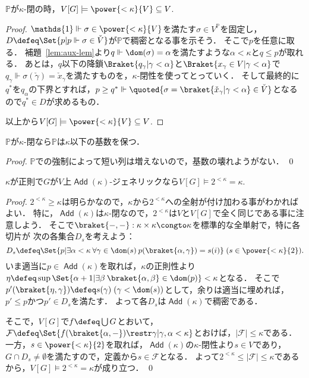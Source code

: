 \documentclass[a4j]{ltjsarticle}
\renewcommand{\Add}{\mathop{\mathsf{Add}}}
\begin{document}
\begin{lemma}
 $\mathbb{P}$が$\kappa$-閉の時，$V[G] \models \power{< \kappa}{V} \subseteq V$.
\end{lemma}
\begin{proof}
 $\mathds{1} \Vdash \sigma \in \power{<\kappa}{V}$を満たす$\sigma \in V^{\mathbb{P}}$を固定し，$D \defeq \Set{p | p \Vdash \sigma \in \check{V}}$が$\mathbb{P}$で稠密となる事を示そう．
 そこで$p$を任意に取る．
 補題~\ref{lem:aux-lem}より$q \Vdash \dom(\sigma) = \alpha$を満たすような$\alpha < \kappa$と$q \leq p$が取れる．
 あとは，$q$以下の降鎖$\Braket{q_\gamma | \gamma < \alpha}$と$\Braket{x_\gamma \in V | \gamma < \alpha}$で$q_\gamma \Vdash \sigma(\check{\gamma}) = \check{x}_\gamma$を満たすものを，$\kappa$-閉性を使ってとっていく．
 そして最終的に$q^*$を$q_\alpha$の下界とすれば，$p \geq q^* \Vdash \quoted{\sigma = \braket{\check{x}_\gamma | \gamma < \alpha} \in \check{V}}$となるので$q^* \in D$が求めるもの．

 以上から$V[G] \models \power{< \kappa}{V} \subseteq V$.
\end{proof}

\begin{corollary}
 $\mathbb{P}$が$\kappa$-閉なら$\mathbb{P}$は$\kappa$以下の基数を保つ．
\end{corollary}
\begin{proof}
 $\mathbb{P}$での強制によって短い列は増えないので，基数の壊れようがない． \qed
\end{proof}

\begin{lemma}
 $\kappa$が正則で$G$が$V$上$\Add(\kappa)$-ジェネリックなら$V[G] \models 2^{< \kappa } = \kappa$.
\end{lemma}
\begin{proof}
 $2^{< \kappa} \geq \kappa$は明らかなので，$\kappa$から$2^{<\kappa}$への全射が付け加わる事がわかればよい．
 特に，$\Add(\kappa)$は$\kappa$-閉なので，$2^{<\kappa}$は$V$と$V[G]$で全く同じである事に注意しよう．
 そこで$\braket{-, -}: \kappa \times \kappa \congto \kappa$を標準的な全単射で，特に各切片が
 次の各集合$D_s$を考えよう：
 \[
  D_s \defeq \Set{p | \exists \alpha < \kappa \: \forall \gamma \in \dom(s) \:p(\braket{\alpha, \gamma}) = s(i)}\;(s \in \power{<\kappa}{2}).
 \]
 いま適当に$p \in \Add(\kappa)$を取れば，$\kappa$の正則性より$\eta \defeq \sup \Set{\alpha+1 | \exists \beta \: \braket{\alpha, \beta} \in \dom(p)} < \kappa$となる．
 そこで$p'(\braket{\eta, \gamma}) \defeq s(\gamma)\;(\gamma < \dom(s))$として，余りは適当に埋めれば，$p' \leq p$かつ$p' \in D_s$を満たす．
 よって各$D_s$は$\Add(\kappa)$で稠密である．

 そこで，$V[G]$で$f \defeq \bigcup G$とおいて，$\mathcal{F} \defeq \Set{ f(\braket{\alpha, -}) \restr \gamma | \gamma, \alpha < \kappa}$とおけば，$|\mathcal{F}| \leq \kappa$である．
 一方，$s \in \power{<\kappa}{2}$を取れば，$\Add(\kappa)$の$\kappa$-閉性より$s \in V$であり，$G \cap D_s \neq \emptyset$を満たすので，定義から$s \in \mathcal{F}$となる．
 よって$2^{<\kappa} \leq |\mathcal{F}| \leq \kappa$であるから，$V[G] \models 2^{<\kappa} = \kappa$が成り立つ． \qed
\end{proof}
\end{document}
